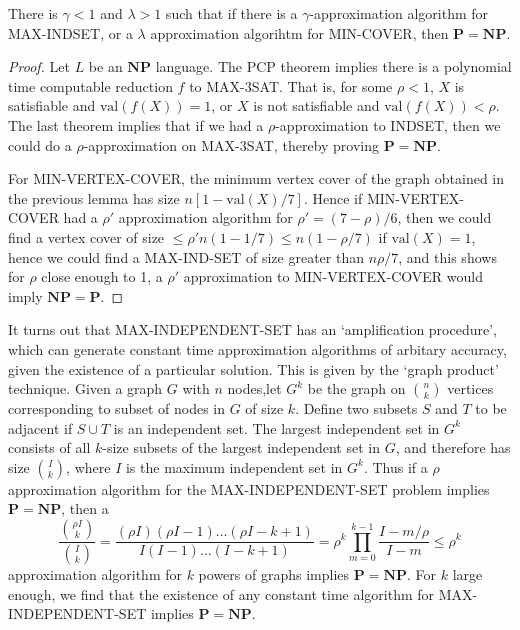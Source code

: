 \begin{theorem}
    There is $\gamma < 1$ and $\lambda > 1$ such that if there is a $\gamma$-approximation algorithm for MAX-INDSET, or a $\lambda$ approximation algorihtm for MIN-COVER, then $\mathbf{P} = \mathbf{NP}$.
\end{theorem}
\begin{proof}
    Let $L$ be an $\mathbf{NP}$ language. The PCP theorem implies there is a polynomial time computable reduction $f$ to MAX-3SAT. That is, for some $\rho < 1$, $X$ is satisfiable and $\text{val}(f(X)) = 1$, or $X$ is not satisfiable and $\text{val}(f(X)) < \rho$. The last theorem implies that if we had a $\rho$-approximation to INDSET, then we could do a $\rho$-approximation on MAX-3SAT, thereby proving $\mathbf{P} = \mathbf{NP}$.

    For MIN-VERTEX-COVER, the minimum vertex cover of the graph obtained in the previous lemma has size $n[1 - \text{val}(X)/7]$. Hence if MIN-VERTEX-COVER had a $\rho'$ approximation algorithm for $\rho' = (7 - \rho)/6$, then we could find a vertex cover of size $\leq \rho' n (1 - 1/7) \leq n (1 - \rho/7)$ if $\text{val}(X) = 1$, hence we could find a MAX-IND-SET of size greater than $n \rho/7$, and this shows for $\rho$ close enough to 1, a $\rho'$ approximation to MIN-VERTEX-COVER would imply $\mathbf{NP} = \mathbf{P}$.
\end{proof}

It turns out that MAX-INDEPENDENT-SET has an `amplification procedure', which can generate constant time approximation algorithms of arbitary accuracy, given the existence of a particular solution. This is given by the `graph product' technique. Given a graph $G$ with $n$ nodes,let $G^k$ be the graph on ${n \choose k}$ vertices corresponding to subset of nodes in $G$ of size $k$. Define two subsets $S$ and $T$ to be adjacent if $S \cup T$ is an independent set. The largest independent set in $G^k$ consists of all $k$-size subsets of the largest independent set in $G$, and therefore has size ${I \choose k}$, where $I$ is the maximum independent set in $G^k$. Thus if a $\rho$ approximation algorithm for the MAX-INDEPENDENT-SET problem implies $\mathbf{P} = \mathbf{NP}$, then a
%
\[ \frac{{\rho I \choose k}}{{I \choose k}} = \frac{(\rho I)(\rho I - 1) \dots (\rho I - k + 1)}{I(I-1) \dots (I-k+1)} = \rho^k \prod_{m = 0}^{k-1} \frac{I - m/\rho}{I - m} \leq \rho^k \]
%
approximation algorithm for $k$ powers of graphs implies $\mathbf{P} = \mathbf{NP}$. For $k$ large enough, we find that the existence of any constant time algorithm for MAX-INDEPENDENT-SET implies $\mathbf{P} = \mathbf{NP}$.

